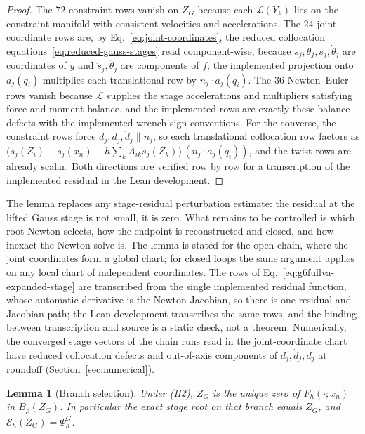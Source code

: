 \documentclass[preprint,12pt]{elsarticle}
\newtheorem{lemma}{Lemma}
\begin{document}
\begin{proof}
The $72$ constraint rows vanish on $Z_G$ because each $\mathcal L(Y_k)$ lies on the constraint
manifold with consistent velocities and accelerations. The $24$ joint-coordinate rows are, by
Eq.~\eqref{eq:joint-coordinates}, the reduced collocation equations~\eqref{eq:reduced-gauss-stages}
read component-wise, because $s_j,\theta_j,\dot s_j,\dot\theta_j$ are coordinates of $y$ and
$\ddot s_j,\ddot\theta_j$ are components of $f$; the implemented projection onto $a_j(q_i)$
multiplies each translational row by $n_j\cdot a_j(q_i)$. The $36$ Newton--Euler rows vanish because
$\mathcal L$ supplies the stage accelerations and multipliers satisfying force and moment balance,
and the implemented rows are exactly these balance defects with the implemented wrench sign
conventions. For the converse, the constraint rows force $d_j,\dot d_j,\ddot d_j\parallel n_j$, so
each translational collocation row factors as
$\bigl(s_j(Z_i)-s_j(x_n)-h\sum_kA_{ik}\dot s_j(Z_k)\bigr)\,(n_j\cdot a_j(q_i))$, and the twist rows
are already scalar. Both directions are verified row by row for a transcription of the implemented
residual in the Lean development.
\end{proof}

The lemma replaces any stage-residual perturbation estimate: the residual at the lifted Gauss
stage is not small, it is zero. What remains to be controlled is which root Newton selects, how the
endpoint is reconstructed and closed, and how inexact the Newton solve is. The lemma is stated for
the open chain, where the joint coordinates form a global chart; for closed loops the same argument
applies on any local chart of independent coordinates. The rows of
Eq.~\eqref{eq:g6fullva-expanded-stage} are transcribed from the single implemented residual
function, whose automatic derivative is the Newton Jacobian, so there is one residual and Jacobian
path; the Lean development transcribes the same rows, and the binding between transcription and
source is a static check, not a theorem. Numerically, the converged stage vectors of the chain runs
read in the joint-coordinate chart have reduced collocation defects and out-of-axis components of
$d_j,\dot d_j,\ddot d_j$ at roundoff (Section~\ref{sec:numerical}).

\begin{lemma}[Branch selection]
\label{lem:stage-residual-defect}
Under (H2), $Z_G$ is the unique zero of $F_h(\cdot;x_n)$ in $B_\rho(Z_G)$. In particular the exact
stage root on that branch equals $Z_G$, and $\mathcal E_h(Z_G)=\Psi_h^G$.
\end{lemma}
\end{document}
